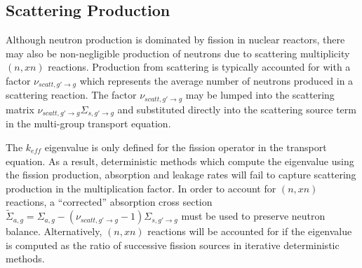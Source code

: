 





\subsection{Scattering Production}
\label{sec:chap2-scatt-prod}

Although neutron production is dominated by fission in nuclear reactors, there may also be non-negligible production of neutrons due to scattering multiplicity $(n,xn)$ reactions. Production from scattering is typically accounted for with a factor $\nu_{scatt,g' \rightarrow g}$ which represents the average number of neutrons produced in a scattering reaction. The factor $\nu_{scatt,g' \rightarrow g}$ may be lumped into the scattering matrix $\nu_{scatt,g' \rightarrow g}\Sigma_{s,g' \rightarrow g}$ and substituted directly into the scattering source term in the multi-group transport equation. 

The $k_{eff}$ eigenvalue is only defined for the fission operator in the transport equation. As a result, deterministic methods which compute the eigenvalue using the fission production, absorption and leakage rates will fail to capture scattering production in the multiplication factor. In order to account for $(n,xn)$ reactions, a ``corrected'' absorption cross section $\tilde{\Sigma}_{a,g} = \Sigma_{a,g} - (\nu_{scatt,g' \rightarrow g} - 1)\Sigma_{s,g' \rightarrow g}$ must be used to preserve neutron balance. Alternatively, $(n,xn)$ reactions will be accounted for if the eigenvalue is computed as the ratio of successive fission sources in iterative deterministic methods.



